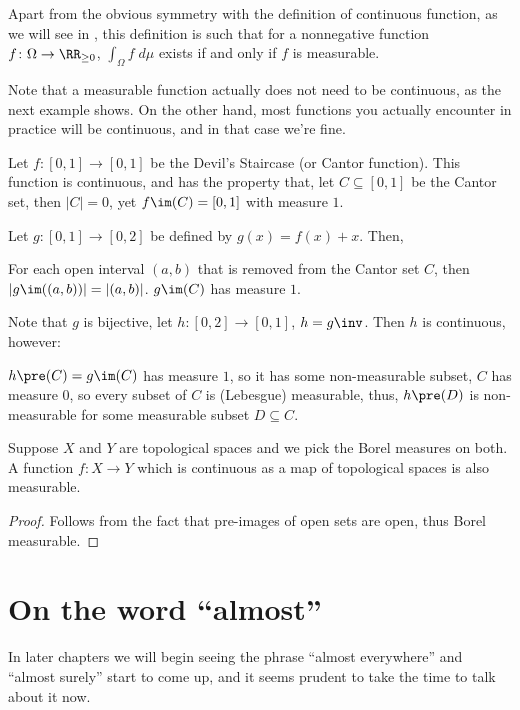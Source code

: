 Apart from the obvious symmetry with the definition of continuous function,
as we will see in , this definition is such that
for a nonnegative function $f \colon \Omega \to \RR_{\geq 0}$,
$\int_\Omega f \; d\mu$ exists if and only if $f$ is measurable.

\begin{remark}
	Note that a measurable function actually does not need to be continuous,
	as the next example shows.
	On the other hand, most functions you actually encounter in practice will be continuous,
	and in that case we're fine.
\end{remark}
\begin{example}
	Let $f \colon [0, 1] \to [0, 1]$ be the Devil's Staircase (or Cantor function).
	This function is continuous, and has the property that, let $C \subseteq [0, 1]$ be the Cantor set,
	then $|C| = 0$, yet $f\im(C) = [0, 1]$ with measure $1$.

	Let $g \colon [0, 1] \to [0, 2]$ be defined by $g(x) = f(x) + x$. Then,
	\begin{itemize}
		\ii For each open interval $(a, b)$ that is removed from the Cantor set $C$, then $|g\im((a,
		b))| = |(a, b)|$.
		\ii $g\im(C)$ has measure $1$.
	\end{itemize}

	Note that $g$ is bijective, let $h \colon [0, 2] \to [0, 1]$, $h = g\inv$. Then $h$ is continuous,
	however:
	\begin{itemize}
		\ii $h\pre(C) = g\im(C)$ has measure $1$, so it has some non-measurable subset,
		\ii $C$ has measure $0$, so every subset of $C$ is (Lebesgue) measurable,
		\ii thus, $h\pre(D)$ is non-measurable for some measurable subset $D \subseteq C$.
	\end{itemize}
\end{example}

\begin{proposition}
	Suppose $X$ and $Y$ are topological spaces
	and we pick the Borel measures on both.
	A function $f \colon X \to Y$
	which is continuous as a map of topological spaces is also measurable.
\end{proposition}
\begin{proof}
	Follows from the fact that pre-images of open sets are open, thus Borel measurable.
\end{proof}

\section{On the word ``almost''}
In later chapters we will begin seeing the phrase ``almost everywhere''
and ``almost surely'' start to come up,
and it seems prudent to take the time to talk about it now.

